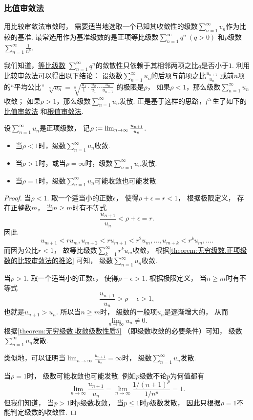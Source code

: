 \subsubsection{比值审敛法}
用比较审敛法审敛时，
需要适当地选取一个已知其收敛性的级数\(\sum_{n=1}^\infty v_n\)作为比较的基准.
最常选用作为基准级数的是正项等比级数\(\sum_{n=1}^\infty q^n\ (q>0)\)
和\(p\)级数\(\sum_{n=1}^\infty \frac1{n^p}\).

我们知道，\hyperref[example:无穷级数.等比级数的收敛性]{等比级数}
\(\sum_{n=1}^\infty q^n\)的敛散性只依赖于其相邻两项之比\(q\)是否小于\(1\).
利用\hyperref[theorem:无穷级数.正项级数的比较审敛法]{比较审敛法}可以得出以下结论：
设级数\(\sum_{n=1}^\infty u_n\)的后项与前项之比\(\frac{u_{n+1}}{u_n}\)
或前\(n\)项的“平均公比”
\(\sqrt[n]{u_n}
= \sqrt[n]{\frac{u_1}1\cdot\frac{u_2}{u_1}\dotsm\frac{u_n}{u_{n-1}}}\)
的极限是\(\rho\)，
如果\(\rho<1\)，那么级数\(\sum_{n=1}^\infty u_n\)收敛；
如果\(\rho>1\)，那么级数\(\sum_{n=1}^\infty u_n\)发散.
正是基于这样的思路，产生了如下的\hyperref[theorem:无穷级数.正项级数的比值审敛法]{比值审敛法}%
和\hyperref[theorem:无穷级数.正项级数的根值审敛法]{根值审敛法}.

\begin{theorem}\label{theorem:无穷级数.正项级数的比值审敛法}
设\(\sum_{n=1}^\infty u_n\)是正项级数，
记\(\rho := \lim_{n\to\infty} \frac{u_{n+1}}{u_n}\).
\begin{itemize}
	\item 当\(\rho<1\)时，级数\(\sum_{n=1}^\infty u_n\)收敛.
	\item 当\(\rho>1\)时，或当\(\rho=\infty\)时，级数\(\sum_{n=1}^\infty u_n\)发散.
	\item 当\(\rho=1\)时，级数\(\sum_{n=1}^\infty u_n\)可能收敛也可能发散.
\end{itemize}
\begin{proof}
当\(\rho<1\).
取一个适当小的正数\(\epsilon\)，
使得\(\rho+\epsilon=r<1\)，
根据极限定义，
存在正整数\(m\)，
当\(n \geq m\)时有不等式\[
	\frac{u_{n+1}}{u_n} < \rho + \epsilon = r.
\]
因此\[
	u_{m+1} < r u_m,
	u_{m+2} < r u_{m+1} < r^2 u_m,
	\dotsc,
	u_{m+k} < r^k u_m,
	\dotsc.
\]
而因为公比\(r<1\)，
故等比级数\(\sum_{k=1}^\infty r^k u_m\)收敛，
根据\cref{theorem:无穷级数.正项级数的比较审敛法的推论} 可知，
级数\(\sum_{n=1}^\infty u_n\)收敛.

当\(\rho>1\).
取一个适当小的正数\(\epsilon\)，
使得\(\rho-\epsilon>1\).
根据极限定义，
当\(n \geq m\)时有不等式\[
	\frac{u_{n+1}}{u_n} > \rho-\epsilon > 1,
\]
也就是\(u_{n+1}>u_n\).
所以当\(n \geq m\)时，
级数的一般项\(u_n\)是逐渐增大的，
从而\[
	\lim_{n\to\infty} u_n \neq 0.
\]
根据\cref{theorem:无穷级数.收敛级数性质5} （即级数收敛的必要条件）可知，
级数\(\sum_{n=1}^\infty u_n\)发散.

类似地，可以证明当\(\lim_{n\to\infty} \frac{u_{n+1}}{u_n} = \infty\)时，
级数\(\sum_{n=1}^\infty u_n\)发散.

当\(\rho = 1\)时，
级数可能收敛也可能发散.
例如\(p\)级数不论\(p\)为何值都有\[
	\lim_{n\to\infty} \frac{u_{n+1}}{u_n}
	= \lim_{n\to\infty} \frac{1/(n+1)^p}{1/n^p} = 1.
\]
但我们知道，
当\(p>1\)时\(p\)级数收敛，
当\(p\leq1\)时\(p\)级数发散，
因此只根据\(\rho=1\)不能判定级数的收敛性.
\end{proof}
\end{theorem}

